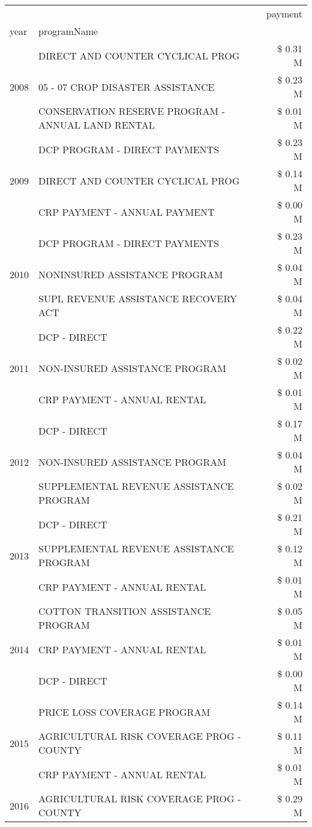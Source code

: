\begin{tabular}{llr}
\toprule
 &  & payment \\
year & programName &  \\
\midrule
\multirow[t]{3}{*}{2008} & DIRECT AND COUNTER CYCLICAL PROG & \$ 0.31 M \\
 & 05 - 07 CROP DISASTER ASSISTANCE & \$ 0.23 M \\
 & CONSERVATION RESERVE PROGRAM - ANNUAL LAND RENTAL & \$ 0.01 M \\
\cline{1-3}
\multirow[t]{3}{*}{2009} & DCP PROGRAM - DIRECT PAYMENTS & \$ 0.23 M \\
 & DIRECT AND COUNTER CYCLICAL PROG & \$ 0.14 M \\
 & CRP PAYMENT - ANNUAL PAYMENT & \$ 0.00 M \\
\cline{1-3}
\multirow[t]{3}{*}{2010} & DCP PROGRAM - DIRECT PAYMENTS & \$ 0.23 M \\
 & NONINSURED ASSISTANCE PROGRAM & \$ 0.04 M \\
 & SUPL REVENUE ASSISTANCE RECOVERY ACT & \$ 0.04 M \\
\cline{1-3}
\multirow[t]{3}{*}{2011} & DCP - DIRECT & \$ 0.22 M \\
 & NON-INSURED ASSISTANCE PROGRAM & \$ 0.02 M \\
 & CRP PAYMENT - ANNUAL RENTAL & \$ 0.01 M \\
\cline{1-3}
\multirow[t]{3}{*}{2012} & DCP - DIRECT & \$ 0.17 M \\
 & NON-INSURED ASSISTANCE PROGRAM & \$ 0.04 M \\
 & SUPPLEMENTAL REVENUE ASSISTANCE PROGRAM & \$ 0.02 M \\
\cline{1-3}
\multirow[t]{3}{*}{2013} & DCP - DIRECT & \$ 0.21 M \\
 & SUPPLEMENTAL REVENUE ASSISTANCE PROGRAM & \$ 0.12 M \\
 & CRP PAYMENT - ANNUAL RENTAL & \$ 0.01 M \\
\cline{1-3}
\multirow[t]{3}{*}{2014} & COTTON TRANSITION ASSISTANCE PROGRAM & \$ 0.05 M \\
 & CRP PAYMENT - ANNUAL RENTAL & \$ 0.01 M \\
 & DCP - DIRECT & \$ 0.00 M \\
\cline{1-3}
\multirow[t]{3}{*}{2015} & PRICE LOSS COVERAGE PROGRAM & \$ 0.14 M \\
 & AGRICULTURAL RISK COVERAGE PROG - COUNTY & \$ 0.11 M \\
 & CRP PAYMENT - ANNUAL RENTAL & \$ 0.01 M \\
\cline{1-3}
\multirow[t]{3}{*}{2016} & AGRICULTURAL RISK COVERAGE PROG - COUNTY & \$ 0.29 M \\

\end{tabular}
